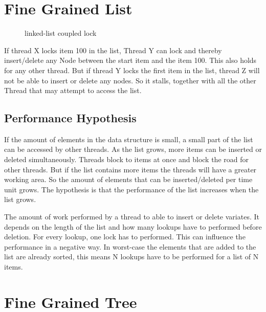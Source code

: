 \documentclass[10pt,a4paper]{article}
\begin{document}
\section{Fine Grained List}
\begin{figure}[h]
\centerline{
}
\caption{linked-list coupled lock}
\end{figure}

If thread X locks item 100 in the list, Thread Y can lock and thereby
insert/delete any Node between the start item and the item 100. This
also holds for any other thread. But if thread Y locks the first item in the
list, thread Z will not be able to insert or delete any nodes. So it stalls,
together with all the other Thread that may attempt to access the list.

\subsection{Performance Hypothesis}
If the amount of elements in the data structure is small, a small part of the
list can be accessed by other threads. As the list grows, more items can be 
inserted or deleted simultaneously. Threads block to items at once and block
the road for other threads. But if the list contains more items the threads
will have a greater working area. So the amount of elements that can be inserted/deleted 
per time unit grows.
The hypothesis is that the performance of the list increases when the list 
grows. 

The amount of work performed by a thread to able to insert or delete variates.
It depends on the length of the list and how many lookups have to performed
before deletion. For every lookup, one lock has to performed. This can
influence the performance in a negative way. In worst-case the elements that
are added to the list are already sorted, this means N lookups have to be
performed for a list of N items.

\section{Fine Grained Tree}
\end{document}
